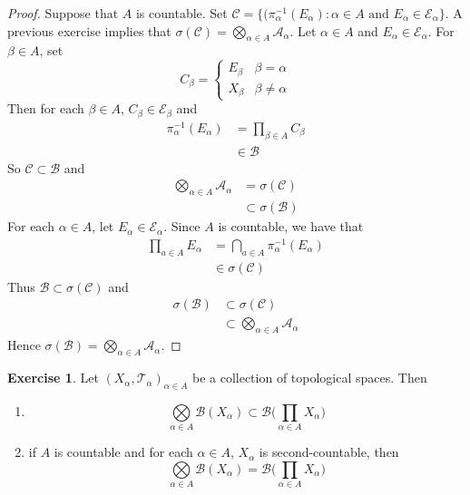 \documentclass{book}
\theoremstyle{definition}
\newtheorem{ex}[definition]{Exercise}
\newcommand{\al}{\alpha}
\newcommand{\be}{\beta}
\newcommand{\sig}{\sigma}
\newcommand{\MA}{\mathcal{A}}
\newcommand{\MB}{\mathcal{B}}
\newcommand{\MC}{\mathcal{C}}
\newcommand{\ME}{\mathcal{E}}
\newcommand{\MT}{\mathcal{T}}
\newcommand{\lex}[1]{\label{ex:#1}}
\DeclareMathOperator*{\0}{\mbf{0}}
\DeclareMathOperator*{\1}{\mbf{1}}
\begin{document}
 	\begin{proof}
 		Suppose that $A$ is countable. Set $\MC =  \bigg \{ (\pi_{\al}^{-1}(E_{\al}): \al \in A \text{ and }E_{\al} \in \ME_{\al} \bigg \}$. A previous exercise implies that $\sig(\MC) = \bigotimes\limits_{\al \in A} \MA_{\al}$. Let $\al \in A$ and $E_{\al} \in \ME_{\al}$. For $\be \in A$, set 
 		\[
 		C_{\be} = 
 		\begin{cases}
 			E_{\be} & \be = \al \\
 			X_{\be} & \be \neq \al
 		\end{cases}
 		\]
 		Then for each $\beta \in A$, $C_{\be} \in \ME_{\be}$ and
 		\begin{align*}
 			\pi_{\al}^{-1}(E_{\al}) 
 			& = \prod_{\be \in A} C_{\be} \\
 			& \in \MB
 		\end{align*}
 		So $\MC \subset \MB$ and 
 		\begin{align*}
 			\bigotimes\limits_{\al \in A} \MA_{\al}
 			& = \sig(\MC) \\
 			& \subset \sig(\MB)
 		\end{align*}
 		For each $\al \in A$, let $E_{\al} \in \ME_{\al}$. Since $A$ is countable, we have that 
 		\begin{align*}
 			\prod_{a \in A} E_{\al} 
 			& = \bigcap_{a \in A} \pi_{\al}^{-1}(E_{\al}) \\
 			& \in \sig(\MC) 
 		\end{align*}
 		Thus $\MB \subset \sig(\MC)$ and 
 		\begin{align*}
 			\sig(\MB)
 			& \subset \sig(\MC) \\ 
 			& \subset \bigotimes\limits_{\al \in A} \MA_{\al} 
 		\end{align*}
 		Hence $\sig(\MB) = \bigotimes\limits_{\al \in A} \MA_{\al}$.
 	\end{proof}
 
 	\begin{ex} \lex{25005}
 		Let $(X_{\al}, \MT_{\al})_{\al \in A}$ be a collection of topological spaces. Then 
 		\begin{enumerate}
 			\item $$\bigotimes\limits_{\al \in A}  \MB(X_{\al}) \subset \MB \bigg( \prod_{\al \in A} X_{\al} \bigg)$$
 			\item if $A$ is countable and for each $\al \in A$, $X_{\al}$ is second-countable, then $$\bigotimes\limits_{\al \in A}  \MB(X_{\al}) = \MB \bigg( \prod_{\al \in A} X_{\al} \bigg)$$
 		\end{enumerate}
 	\end{ex}
 
\end{document}
